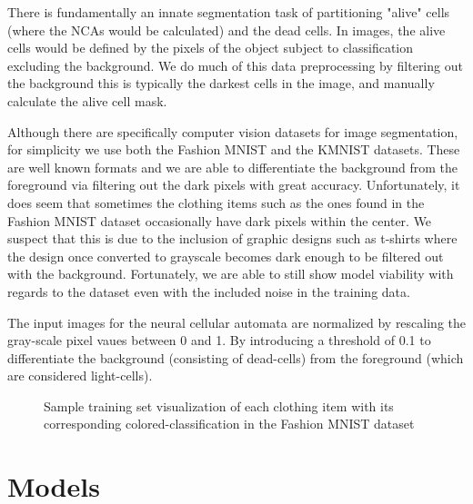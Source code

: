\documentclass[conference]{IEEEtran}
\begin{document}
There is fundamentally an innate segmentation task of partitioning "alive" cells (where the NCAs would be calculated) and the dead cells. In images, the alive cells would be defined by the pixels of the object subject to classification excluding the background. We do much of this data preprocessing by filtering out the background this is typically the darkest cells in the image, and manually calculate the alive cell mask.

Although there are specifically computer vision datasets for image segmentation, for simplicity we use both the Fashion MNIST and the KMNIST datasets. These are well known formats and we are able to differentiate the background from the foreground via filtering out the dark pixels with great accuracy. Unfortunately, it does seem that sometimes the clothing items such as the ones found in the Fashion MNIST dataset occasionally have dark pixels within the center. We suspect that this is due to the inclusion of graphic designs such as t-shirts where the design once converted to grayscale becomes dark enough to be filtered out with the background. Fortunately, we are able to still show model viability with regards to the dataset even with the included noise in the training data. 
 
The input images for the neural cellular automata are normalized by rescaling the gray-scale pixel vaues between 0 and 1. By introducing a threshold of 0.1 to differentiate the background (consisting of dead-cells) from the foreground (which are considered light-cells). 

\begin{figure}[htbp]
\caption{Sample training set visualization of each clothing item with its corresponding colored-classification in the Fashion MNIST dataset }
\end{figure}

\section{Models}
\end{document}
